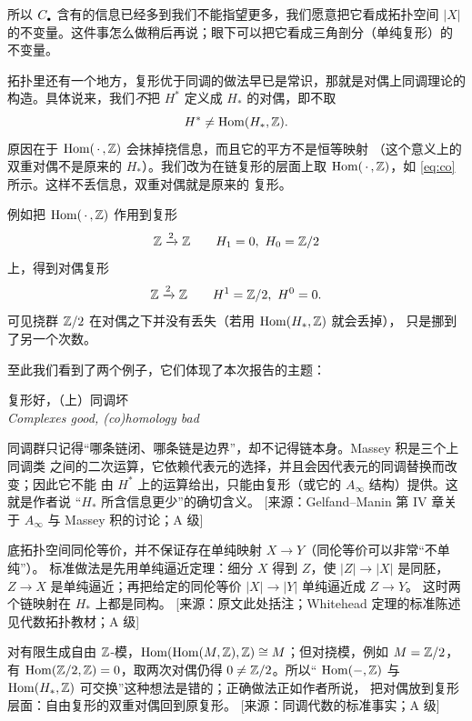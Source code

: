 所以 $C_{\scriptscriptstyle\bullet}$ 含有的信息已经多到我们不能指望更多，我们愿意把它看成拓扑空间
$|X|$ 的不变量。这件事怎么做稍后再说；眼下可以把它看成三角剖分（单纯复形）的
不变量。

拓扑里还有一个地方，复形优于同调的做法早已是常识，那就是对偶上同调理论的
构造。具体说来，我们\emph{不}把 $H^*$ 定义成 $H_*$ 的对偶，即不取
$$
H^*\ne\operatorname{Hom}(H_*,\mathbb{Z}).
$$
原因在于 $\operatorname{Hom}(\,\cdot\,,\mathbb{Z})$ 会抹掉挠信息，而且它的平方不是恒等映射
（这个意义上的双重对偶不是原来的 $H_*$）。我们改为在链复形的层面上取
$\operatorname{Hom}(\,\cdot\,,\mathbb{Z})$，如 \eqref{eq:co} 所示。这样不丢信息，双重对偶就是原来的
复形。

例如把 $\operatorname{Hom}(\,\cdot\,,\mathbb{Z})$ 作用到复形
$$
\mathbb{Z}\xrightarrow{2}\mathbb{Z}\qquad H_1=0,\ H_0=\mathbb{Z}/2
$$
上，得到对偶复形
$$
\Z\xrightarrow{2}\Z\qquad H^1=\Z/2,\ H^0=0.
$$
可见挠群 $\mathbb{Z}/2$ 在对偶之下并没有丢失（若用 $\operatorname{Hom}(H_*,\mathbb{Z})$ 就会丢掉），
只是挪到了另一个次数。

至此我们看到了两个例子，它们体现了本次报告的主题：
\begin{center}
\begin{tcolorbox}[colback=black!2!white, colframe=black!60!black, boxrule=0.8pt,
  arc=0pt, width=8.6cm, halign=center, top=2pt, bottom=2pt]
复形好，（上）同调坏\\[2pt]
{\small\itshape Complexes good, (co)homology bad}
\end{tcolorbox}
\end{center}

\begin{yizhu}
同调群只记得“哪条链闭、哪条链是边界”，却不记得链本身。Massey 积是三个上同调类
之间的二次运算，它依赖代表元的选择，并且会因代表元的同调替换而改变；因此它不能
由 $H^*$ 上的运算给出，只能由复形（或它的 $A_\infty$ 结构）提供。这就是作者说
“$H_*$ 所含信息更少”的确切含义。
[来源：Gelfand--Manin 第 IV 章关于 $A_\infty$ 与 Massey 积的讨论；A 级]
\end{yizhu}

\begin{yizhu}
底拓扑空间同伦等价，并不保证存在单纯映射 $X\to Y$（同伦等价可以非常“不单纯”）。
标准做法是先用单纯逼近定理：细分 $X$ 得到 $Z$，使 $|Z|\to|X|$ 是同胚，
$Z\to X$ 是单纯逼近；再把给定的同伦等价 $|X|\to|Y|$ 单纯逼近成 $Z\to Y$。
这时两个链映射在 $H_*$ 上都是同构。
[来源：原文此处括注；Whitehead 定理的标准陈述见代数拓扑教材；A 级]
\end{yizhu}

\begin{yizhu}[双重对偶为什么不是恒等]
对有限生成自由 $\mathbb{Z}$-模，$\operatorname{Hom}(\operatorname{Hom}(M,\mathbb{Z}),\mathbb{Z})\cong M$；但对挠模，例如
$M=\mathbb{Z}/2$，有 $\operatorname{Hom}(\mathbb{Z}/2,\mathbb{Z})=0$，取两次对偶仍得 $0\ne\mathbb{Z}/2$。所以“
$\operatorname{Hom}(-,\mathbb{Z})$ 与 $\operatorname{Hom}(H_*,\mathbb{Z})$ 可交换”这种想法是错的；正确做法正如作者所说，
把对偶放到复形层面：自由复形的双重对偶回到原复形。
[来源：同调代数的标准事实；A 级]
\end{yizhu}

